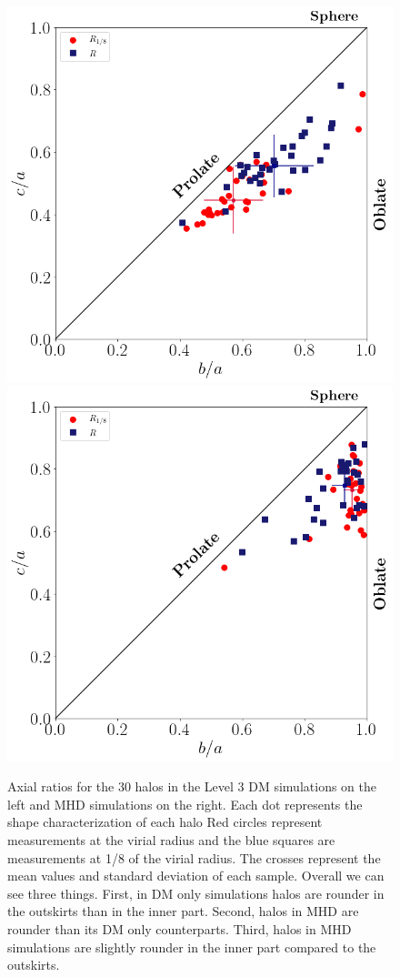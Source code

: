 \documentclass[a4paper,fleqn,usenatbib]{mnras}
\begin{document}
 
\begin{figure}
\begin{center}
\includegraphics[width=0.9\columnwidth]{./pics/Triaxial_Plane/Lvl_4_Triax_Plane_DM.png}
 \includegraphics[width=0.9\columnwidth]{./pics/Triaxial_Plane/Lvl_4_Triax_Plane_MHD.png}
\end{center}
\caption{Axial ratios for the 30 halos in the Level 3 DM simulations
  on the left and MHD simulations on the right.
   Each dot represents the shape characterization of each halo 
   Red circles represent measurements at the virial radius and the
   blue squares are measurements at 1/8 of the virial radius.   
   The crosses represent the mean values and standard deviation of
   each sample.
   Overall we can see three things. 
   First, in DM only simulations halos are rounder in the outskirts
   than in the inner part.
   Second, halos in MHD are rounder than its DM only counterparts.
   Third, halos in MHD simulations are slightly rounder in the inner
   part compared to the outskirts.}
  \label{fig:triaxiality_plane}
\end{figure}
\end{document}
